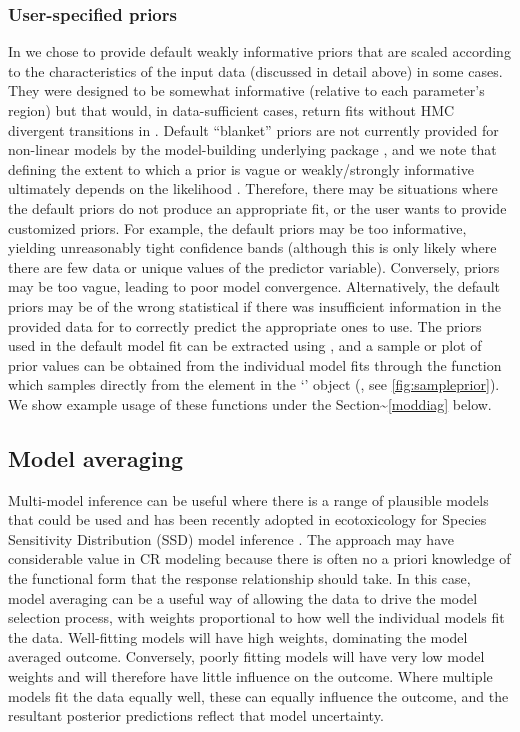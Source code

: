 \documentclass[
  shortnames]{jss}
\newcommand{\cls}[1]{`\code{#1}'}
\begin{document}
\subsubsection[User-specified priors]{User-specified priors}\label{usp}

In  we chose to provide default weakly informative priors that are scaled according to the characteristics of the input data (discussed in detail above) in some cases. They were designed to be somewhat informative (relative to each parameter's region) but that would, in data-sufficient cases, return fits without HMC divergent transitions in . Default ``blanket'' priors are not currently provided for non-linear models by the model-building underlying package , and we note that defining the extent to which a prior is vague or weakly/strongly informative ultimately depends on the likelihood \citep{gelman2017entropy}. Therefore, there may be situations where the default  priors do not produce an appropriate fit, or the user wants to provide customized priors. For example, the default priors may be too informative, yielding unreasonably tight confidence bands (although this is only likely where there are few data or unique values of the predictor variable). Conversely, priors may be too vague, leading to poor model convergence. Alternatively, the default priors may be of the wrong statistical  if there was insufficient information in the provided data for  to correctly predict the appropriate ones to use. The priors used in the default model fit can be extracted using , and a sample or plot of prior values can be obtained from the individual  model fits through the function  which samples directly from the  element in the \cls{brmsfit} object (, see \autoref{fig:sampleprior}). We show example usage of these functions under the Section\textasciitilde{}\ref{moddiag} below.

\subsection[Model averaging]{Model averaging}\label{modavg}

Multi-model inference can be useful where there is a range of plausible models that could be used \citep{Burnham2002} and has been recently adopted in ecotoxicology for Species Sensitivity Distribution (SSD) model inference \citep{Thorley2018, fox2020, Dalgarno}. The approach may have considerable value in CR modeling because there is often no a priori knowledge of the functional form that the response relationship should take. In this case, model averaging can be a useful way of allowing the data to drive the model selection process, with weights proportional to how well the individual models fit the data. Well-fitting models will have high weights, dominating the model averaged outcome. Conversely, poorly fitting models will have very low model weights and will therefore have little influence on the outcome. Where multiple models fit the data equally well, these can equally influence the outcome, and the resultant posterior predictions reflect that model uncertainty.
\end{document}
